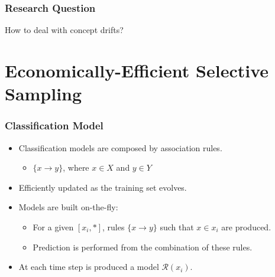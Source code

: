 \documentclass[14pt]{beamer}
\begin{document}
\begin{frame}\frametitle{Research Question}

\begin{center}
\large{How to deal with concept drifts?}
\end{center}
\end{frame}

\section{Economically-Efficient Selective Sampling}
\begin{frame}\frametitle{Classification Model}
\begin{itemize}
\item Classification models are composed by association rules.
  \begin{itemize}
    \item $\{x \to y\}$, where $x \in X$ and $y \in Y$
  \end{itemize}
\item \alert{Efficiently updated as the training set evolves.}
\item Models are built on-the-fly:
  \begin{itemize}
    \item For a given $[x_i, *]$, rules $\{x \to y\}$ such that $x \in x_i$ are produced.
    \item Prediction is performed from the combination of these rules.
  \end{itemize}
\item At each time step is produced a model $\mathcal{R}(x_i)$.
\pause
\end{itemize}
\end{frame}
\end{document}
